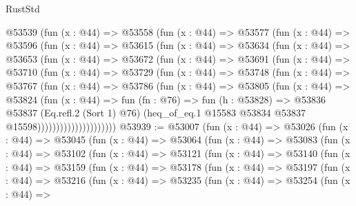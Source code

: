 \begin{lexlean}{RustStd}
\begin{coremodule}
          @53539
            (fun (x : @44) =>
            @53558
              (fun (x : @44) =>
              @53577
                (fun (x : @44) =>
                @53596
                  (fun (x : @44) =>
                  @53615
                    (fun (x : @44) =>
                    @53634
                      (fun (x : @44) =>
                      @53653
                        (fun (x : @44) =>
                        @53672
                          (fun (x : @44) =>
                          @53691
                            (fun (x : @44) =>
                            @53710
                              (fun (x : @44) =>
                              @53729
                                (fun (x : @44) =>
                                @53748
                                  (fun (x : @44) =>
                                  @53767
                                    (fun (x : @44) =>
                                    @53786
                                      (fun (x : @44) =>
                                      @53805
                                        (fun (x : @44) =>
                                        @53824
                                          (fun (x : @44) =>
                                          fun (fn : @76) =>
                                          fun (h : @53828) =>
                                          @53836
                                            @53837
                                            (Eq.refl.{2} (Sort 1) @76)
                                            (heq_of_eq.{1}
                                              @15583
                                              @53834
                                              @53837
                                              @15598)))))))))))))))))))))
@53939 := @53007
    (fun (x : @44) =>
    @53026
      (fun (x : @44) =>
      @53045
        (fun (x : @44) =>
        @53064
          (fun (x : @44) =>
          @53083
            (fun (x : @44) =>
            @53102
              (fun (x : @44) =>
              @53121
                (fun (x : @44) =>
                @53140
                  (fun (x : @44) =>
                  @53159
                    (fun (x : @44) =>
                    @53178
                      (fun (x : @44) =>
                      @53197
                        (fun (x : @44) =>
                        @53216
                          (fun (x : @44) =>
                          @53235
                            (fun (x : @44) =>
                            @53254
                              (fun (x : @44) =>

\end{coremodule}
\end{lexlean}
